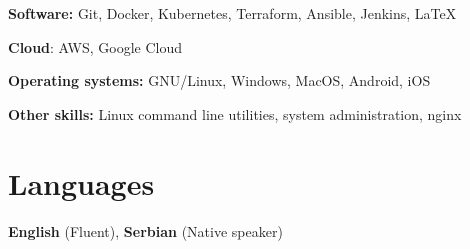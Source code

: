 \documentclass[11pt,a4paper,roman]{moderncv}        %
\begin{document}
\textbf{Software:} Git, Docker, Kubernetes, Terraform, Ansible, Jenkins, \LaTeX

\textbf{Cloud}: AWS, Google Cloud

\textbf{Operating systems:} GNU/Linux, Windows, MacOS, Android, iOS

\textbf{Other skills:} Linux command line utilities, system administration, nginx

\section{Languages}
	\textbf{English} (Fluent), \textbf{Serbian} (Native speaker)
\end{document}
